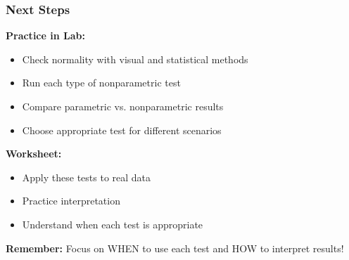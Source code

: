 \documentclass{beamer}
\begin{document}
\begin{frame}
\frametitle{Next Steps}

\textbf{Practice in Lab:}
\begin{itemize}
\item Check normality with visual and statistical methods
\item Run each type of nonparametric test
\item Compare parametric vs. nonparametric results
\item Choose appropriate test for different scenarios
\end{itemize}

\vspace{0.5cm}
\textbf{Worksheet:}
\begin{itemize}
\item Apply these tests to real data
\item Practice interpretation
\item Understand when each test is appropriate
\end{itemize}

\vspace{0.5cm}
\textbf{Remember:} Focus on WHEN to use each test and HOW to interpret results!
\end{frame}
\end{document}

